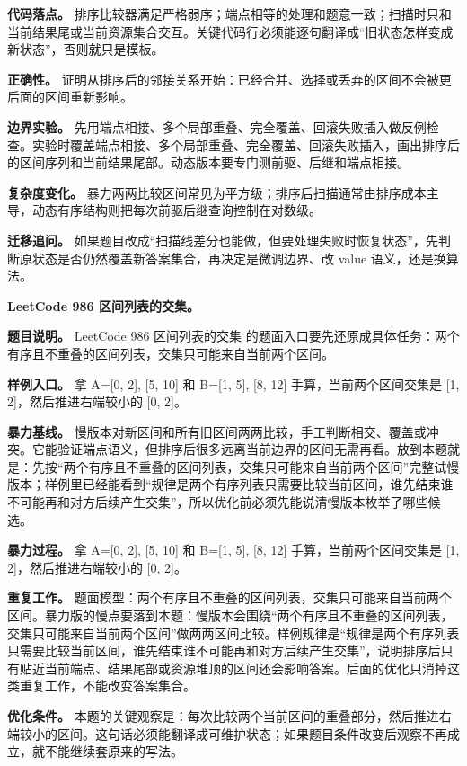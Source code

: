 \textbf{代码落点。} 排序比较器满足严格弱序；端点相等的处理和题意一致；扫描时只和当前结果尾或当前资源集合交互。关键代码行必须能逐句翻译成“旧状态怎样变成新状态”，否则就只是模板。

\textbf{正确性。} 证明从排序后的邻接关系开始：已经合并、选择或丢弃的区间不会被更后面的区间重新影响。

\textbf{边界实验。} 先用端点相接、多个局部重叠、完全覆盖、回滚失败插入做反例检查。实验时覆盖端点相接、多个局部重叠、完全覆盖、回滚失败插入，画出排序后的区间序列和当前结果尾部。动态版本要专门测前驱、后继和端点相接。

\textbf{复杂度变化。} 暴力两两比较区间常见为平方级；排序后扫描通常由排序成本主导，动态有序结构则把每次前驱后继查询控制在对数级。

\textbf{迁移追问。} 如果题目改成“扫描线差分也能做，但要处理失败时恢复状态”，先判断原状态是否仍然覆盖新答案集合，再决定是微调边界、改 value 语义，还是换算法。

\noindent\textbf{LeetCode 986 区间列表的交集。}

\textbf{题目说明。} LeetCode 986 区间列表的交集 的题面入口要先还原成具体任务：两个有序且不重叠的区间列表，交集只可能来自当前两个区间。

\textbf{样例入口。} 拿 A=[0, 2], [5, 10] 和 B=[1, 5], [8, 12] 手算，当前两个区间交集是 [1, 2]，然后推进右端较小的 [0, 2]。

\textbf{暴力基线。} 慢版本对新区间和所有旧区间两两比较，手工判断相交、覆盖或冲突。它能验证端点语义，但排序后很多远离当前边界的区间无需再看。放到本题就是：先按“两个有序且不重叠的区间列表，交集只可能来自当前两个区间”完整试慢版本；样例里已经能看到“规律是两个有序列表只需要比较当前区间，谁先结束谁不可能再和对方后续产生交集”，所以优化前必须先能说清慢版本枚举了哪些候选。

\textbf{暴力过程。} 拿 A=[0, 2], [5, 10] 和 B=[1, 5], [8, 12] 手算，当前两个区间交集是 [1, 2]，然后推进右端较小的 [0, 2]。

\textbf{重复工作。} 题面模型：两个有序且不重叠的区间列表，交集只可能来自当前两个区间。暴力版的慢点要落到本题：慢版本会围绕“两个有序且不重叠的区间列表，交集只可能来自当前两个区间”做两两区间比较。样例规律是“规律是两个有序列表只需要比较当前区间，谁先结束谁不可能再和对方后续产生交集”，说明排序后只有贴近当前端点、结果尾部或资源堆顶的区间还会影响答案。后面的优化只消掉这类重复工作，不能改变答案集合。

\textbf{优化条件。} 本题的关键观察是：每次比较两个当前区间的重叠部分，然后推进右端较小的区间。这句话必须能翻译成可维护状态；如果题目条件改变后观察不再成立，就不能继续套原来的写法。

